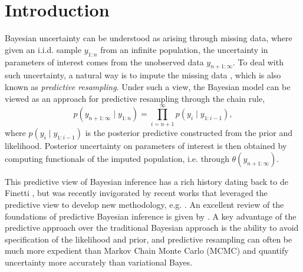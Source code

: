 \documentclass[11pt,a4paper]{article}
\theoremstyle{plain}
\theoremstyle{remark}
\theoremstyle{remark}
\begin{document}
\section{Introduction}
Bayesian uncertainty can be understood as arising through  missing data, where given an i.i.d. sample $y_{1:n}$ from an infinite population, the uncertainty in parameters of interest comes from the unobserved data $y_{n+1:\infty}$. To deal with such uncertainty, a natural way is to impute the missing data \citep{fortini2020quasi,fong2023martingale}, which is also known as \textit{predictive resampling}. Under such a view, the  Bayesian model can be viewed as an approach for predictive resampling through the chain rule,
$$p(y_{n+1:\infty}\mid y_{1:n})=\prod_{i=n+1}^\infty p(y_i\mid y_{1:i-1}),$$
where $p(y_i\mid y_{1:i-1})$ is the posterior predictive constructed from the prior and likelihood. Posterior uncertainty on parameters of interest is then obtained by computing functionals of the imputed population, i.e. through $\theta(y_{n+1:\infty})$. 

This predictive view of Bayesian inference has a rich history dating back to de Finetti \citep{de1937prevision}, but was recently invigorated by recent works that leveraged the predictive view to develop new methodology, e.g. \cite{fortini2020quasi, berti2023bayesian,fong2023martingale}. An excellent review of the foundations of predictive Bayesian inference is given by \cite{fortini2025exchangeability}. A key advantage of the predictive approach over the traditional Bayesian approach
is the ability to avoid specification of the likelihood and prior, and predictive resampling can often be much more expedient than Markov Chain Monte Carlo (MCMC) and quantify uncertainty more accurately than variational Bayes. 
\end{document}
